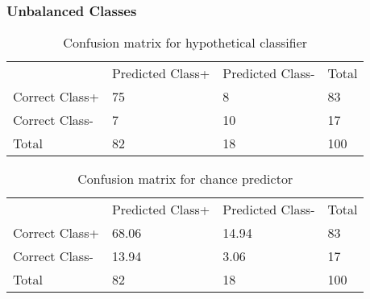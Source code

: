 \begin{frame}
	\frametitle{Unbalanced Classes}
	\begin{table}[htb]
		\centering
		\begin{tabular}{llll}
			\multicolumn{1}{c}{} & Predicted Class+ & Predicted Class- & Total \\ \cmidrule{2-4}
			Correct Class+	& \num{75}	& \num{8}	& 83\\
			Correct Class-	& \num{7}	& \num{10}	& 17\\ \cmidrule{1-4}
			Total			& 82		& 18		& 100
		\end{tabular}
		\caption{Confusion matrix for hypothetical classifier}
	\end{table}
	\begin{table}[htb]
		\centering
		\begin{tabular}{llll}
			\multicolumn{1}{c}{} & Predicted Class+ & Predicted Class- & Total \\ \cmidrule{2-4}
			Correct Class+	& \num{68.06}	& \num{14.94}	& 83\\
			Correct Class-	& \num{13.94}	& \num{3.06}	& 17\\ \cmidrule{1-4}
			Total			& 82		& 18		& 100
		\end{tabular}
		\caption{Confusion matrix for chance predictor}
	\end{table}
\end{frame}

